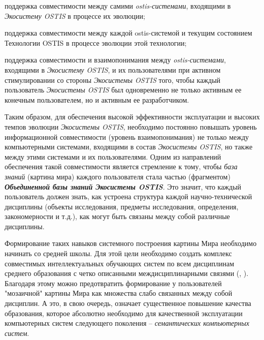 \begin{SCn}
{\begin{scnitemize}
\item поддержка совместимости между самими \textit{ostis-системами}, входящими в \textit{Экосистему OSTIS} в процессе их эволюции;
\item поддержка совместимости между каждой ostis-системой и текущим состоянием Технологии OSTIS в процессе эволюции этой технологии;
\item поддержка совместимости и взаимопонимания между \textit{ostis-системами}, входящими в \textit{Экосистему OSTIS}, и их пользователями при активном стимулировании со стороны \textit{Экосистемы OSTIS} того, чтобы каждый пользователь \textit{Экосистемы OSTIS} был одновременно не только активным ее конечным пользователем, но и активным ее разработчиком.
\end{scnitemize}

Таким образом, для обеспечения высокой эффективности эксплуатации и высоких темпов эволюции  \textit{Экосистемы OSTIS}, необходимо постоянно повышать уровень информационной совместимости (уровень взаимопонимания) не только между компьютерными системами, входящими в состав \textit{Экосистемы OSTIS}, но также между этими системами и их пользователями. Одним из направлений обеспечения такой совместимости является стремление к тому, чтобы \textit{база знаний} (картина мира) каждого пользователя стала частью (фрагментом) \textbf{\textit{Объединенной базы знаний Экосистемы OSTIS}}.  Это значит, что каждый пользователь должен знать, как устроена структура каждой научно-технической дисциплины (объекты исследования, предметы исследования, определения, закономерности и т.д.), как могут быть связаны между собой различные дисциплины.

Формирование таких навыков системного построения картины Мира необходимо начинать со средней школы. Для этой цели необходимо создать комплекс совместимых интеллектуальных обучающих систем по всем дисциплинам среднего образования с четко описанными междисциплинарными связями (, ). Благодаря этому можно предотвратить формирование у пользователей "мозаичной"{} картины Мира как множества слабо связанных между собой дисциплин. А это, в свою очередь, означает существенное повышение качества образования, которое абсолютно необходимо для качественной эксплуатации компьютерных систем следующего поколения -- \textit{семантических компьютерных систем}.

}
\end{SCn}
